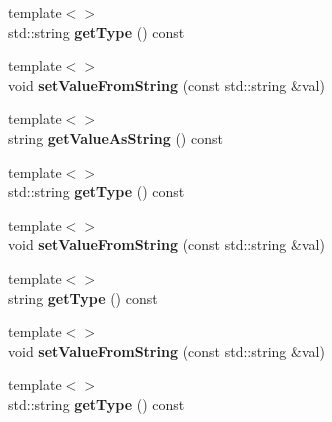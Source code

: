 \begin{DoxyCompactItemize}
\item 
\hypertarget{classrr_1_1_parameter_a10ce222bdadc1fc2a1b4baedc27e9250}{{\footnotesize template$<$$>$ }\\std\-::string {\bfseries get\-Type} () const}\label{classrr_1_1_parameter_a10ce222bdadc1fc2a1b4baedc27e9250}

\item 
\hypertarget{classrr_1_1_parameter_a5504eb55a0b433a3e5cb4830709698ae}{{\footnotesize template$<$$>$ }\\void {\bfseries set\-Value\-From\-String} (const std\-::string \&val)}\label{classrr_1_1_parameter_a5504eb55a0b433a3e5cb4830709698ae}

\item 
\hypertarget{classrr_1_1_parameter_acb86c36538938f6ed68af674de613c1b}{{\footnotesize template$<$$>$ }\\string {\bfseries get\-Value\-As\-String} () const}\label{classrr_1_1_parameter_acb86c36538938f6ed68af674de613c1b}

\item 
\hypertarget{classrr_1_1_parameter_a899e949878451b6f40910a017da2a172}{{\footnotesize template$<$$>$ }\\std\-::string {\bfseries get\-Type} () const}\label{classrr_1_1_parameter_a899e949878451b6f40910a017da2a172}

\item 
\hypertarget{classrr_1_1_parameter_a6c5f6f9f5d8bc04940443c00dbe2b056}{{\footnotesize template$<$$>$ }\\void {\bfseries set\-Value\-From\-String} (const std\-::string \&val)}\label{classrr_1_1_parameter_a6c5f6f9f5d8bc04940443c00dbe2b056}

\item 
\hypertarget{classrr_1_1_parameter_ae81de1125376889d6013d170b0616bef}{{\footnotesize template$<$$>$ }\\string {\bfseries get\-Type} () const}\label{classrr_1_1_parameter_ae81de1125376889d6013d170b0616bef}

\item 
\hypertarget{classrr_1_1_parameter_a92097fe6a2427eca7679f2e5a74aad42}{{\footnotesize template$<$$>$ }\\void {\bfseries set\-Value\-From\-String} (const std\-::string \&val)}\label{classrr_1_1_parameter_a92097fe6a2427eca7679f2e5a74aad42}

\item 
\hypertarget{classrr_1_1_parameter_ab1042673e7d5765d07de84d253907638}{{\footnotesize template$<$$>$ }\\std\-::string {\bfseries get\-Type} () const}\label{classrr_1_1_parameter_ab1042673e7d5765d07de84d253907638}


\end{DoxyCompactItemize}
